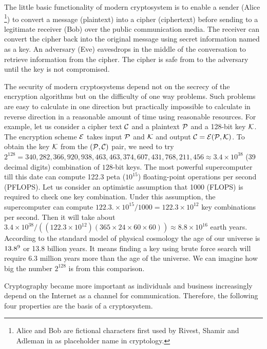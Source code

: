The little basic functionality of modern cryptosystem is to enable a sender (Alice \footnote{Alice and Bob are fictional characters first used by Rivest, Shamir and Adleman in \cite{rivest1978method} as placeholder name in cryptology.}) to convert a message (plaintext) into a cipher (ciphertext) before sending to a legitimate receiver (Bob) over the public communication media. 
The receiver can convert the cipher back into the original message using secret information named as a key.
An adversary (Eve) eavesdrops in the middle of the conversation to retrieve information from the cipher.
The cipher is safe from to the adversary until the key is not compromised. 

The security of modern cryptosystems depend not on the secrecy of the encryption algorithms but on the difficulty of one way problems. 
Such problems are easy to calculate in one direction but practically impossible to calculate in reverse direction in a reasonable amount of time using reasonable resources.
For example, let us consider a cipher text $\cal{C}$ and a plaintext $\cal{P}$ and a 128-bit key $\cal{K}$. 
The encryption scheme $\cal{E}$ takes input $\cal{P}$ and $\cal{K}$ and output $\cal{C}=E( \cal{P}, K)$. 
To obtain the  key $\cal{K}$ from the $(\cal{P,C})$ pair, we need to try $2^{128} = 340,282,366,920,938,463,463,374,607,431,768,211,456 \approx 3.4 \times 10^{38}$ (39 decimal digits) combination of $128$-bit keys.
The most powerful supercomputer till this date  can compute 122.3 peta ($10^{15}$) floating-point operations per second (PFLOPS).
Let us consider an  optimistic assumption that 1000 (FLOPS) is required to check one key combination.
Under this assumption, the supercomputer can compute $122.3. \times 10^{15} / 1000 = 122.3 \times 10^{12}$ key combinations per second.
Then it will take about $3.4 \times 10^{38}/((122.3 \times 10^{12})(365 \times 24 \times 60 \times 60)) \approx  8.8 \times 10^{16}$ earth years.
According to the standard model of physical cosmology \cite{Ade:2015xua} the age of our universe is $13.8 \time 10^9$ or 13.8 billion years. 
It means finding a key using brute force search will require $6.3$ million years more than the age of the universe.
We can imagine how big the number $2^{128}$ is from this comparison.

Cryptography became more important as individuals and business increasingly depend on the Internet as a channel for communication. Therefore, the following four properties are the basis of a cryptosystem.


